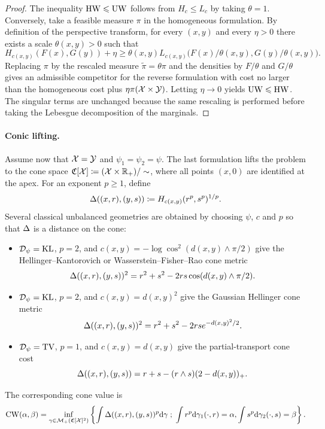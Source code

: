 \begin{proof}
	The inequality $\operatorname{HW}\leqslant\operatorname{UW}$ follows from $H_c\leq L_c$ by taking $\theta=1$. Conversely, take a feasible measure $\pi$ in the homogeneous formulation. By definition of the perspective transform, for every $(x,y)$ and every $\eta>0$ there exists a scale $\theta(x,y)>0$ such that
	\[
		H_{c(x,y)}(F(x),G(y))+\eta
		\geq
		\theta(x,y)L_{c(x,y)}\big(F(x)/\theta(x,y),G(y)/\theta(x,y)\big).
	\]
	Replacing $\pi$ by the rescaled measure $\tilde\pi=\theta\pi$ and the densities by $F/\theta$ and $G/\theta$ gives an admissible competitor for the reverse formulation with cost no larger than the homogeneous cost plus $\eta\pi(\mathcal{X}\times\mathcal{Y})$. Letting $\eta\to0$ yields $\operatorname{UW}\leqslant\operatorname{HW}$. The singular terms are unchanged because the same rescaling is performed before taking the Lebesgue decomposition of the marginals.
\end{proof}

\paragraph{Conic lifting.}

Assume now that $\mathcal{X}=\mathcal{Y}$ and $\psi_1=\psi_2=\psi$. The last formulation lifts the problem to the cone space $\mathfrak C[\mathcal{X}]\coloneqq(\mathcal{X}\times\mathbb{R}_+)/\sim$, where all points $(x,0)$ are identified at the apex. For an exponent $p\geq1$, define
\[
	\Delta((x,r),(y,s))\coloneqq H_{c(x,y)}(r^p,s^p)^{1/p}.
\]
Several classical unbalanced geometries are obtained by choosing $\psi$, $c$ and $p$ so that $\Delta$ is a distance on the cone:
\begin{itemize}
	\item $\mathcal{D}_\psi=\operatorname{KL}$, $p=2$, and $c(x,y)=-\log\cos^2(d(x,y)\wedge\pi/2)$ give the Hellinger--Kantorovich or Wasserstein--Fisher--Rao cone metric
	\[
		\Delta((x,r),(y,s))^2=r^2+s^2-2rs\cos(d(x,y)\wedge\pi/2).
	\]
	\item $\mathcal{D}_\psi=\operatorname{KL}$, $p=2$, and $c(x,y)=d(x,y)^2$ give the Gaussian Hellinger cone metric
	\[
		\Delta((x,r),(y,s))^2=r^2+s^2-2rs e^{-d(x,y)^2/2}.
	\]
	\item $\mathcal{D}_\psi=\operatorname{TV}$, $p=1$, and $c(x,y)=d(x,y)$ give the partial-transport cone cost
	\[
		\Delta((x,r),(y,s))=r+s-(r\wedge s)(2-d(x,y))_+.
	\]
\end{itemize}
The corresponding cone value is
\[
	\operatorname{CW}(\alpha,\beta)
	=
	\inf_{\gamma\in\mathcal{M}_+(\mathfrak C[\mathcal{X}]^2)}
	\left\{
	\int \Delta((x,r),(y,s))^p\mathrm{d}\gamma
	\; ; \;
	\int r^p\mathrm{d}\gamma_1(\cdot,r)=\alpha,
	\int s^p\mathrm{d}\gamma_2(\cdot,s)=\beta
	\right\}.
\]


